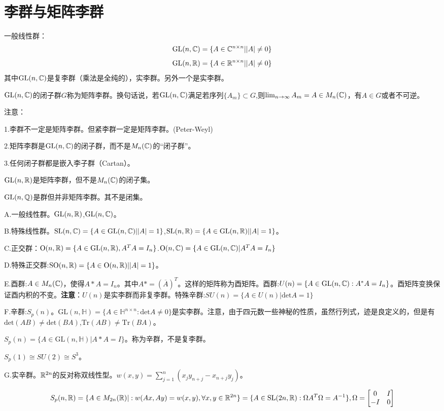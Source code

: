 \section{李群与矩阵李群}
一般线性群：
$$
\mathrm{GL}(n,\mathbb{C})=\{A \in \mathbb{C}^{n\times n}||A|\neq 0\}
$$
$$
\mathrm{GL}(n,\mathbb{R})=\{A \in \mathbb{R}^{n\times n}||A|\neq 0\}
$$
其中$\mathrm{GL}(n,\mathbb{C})$是复李群（乘法是全纯的），实李群。另外一个是实李群。
\begin{definition}[矩阵李群]
    $\mathrm{GL}(n,\mathbb{C})$的闭子群$G$称为矩阵李群。换句话说，若$\mathrm{GL}(n,\mathbb{C})$满足若序列$\{A_m\}\subset G$,则$\lim_{n \to \infty}A_m =A \in M_n(\mathbb{C})$，有$A \in G$或者不可逆。
\end{definition}
注意：

1.李群不一定是矩阵李群。但紧李群一定是矩阵李群。(Peter-Weyl)

2.矩阵李群是$\mathrm{GL}(n,\mathbb{C})$的闭子群，而不是$M_n(\mathbb{C})$的“闭子群”。

3.任何闭子群都是嵌入李子群（Cartan）。

\begin{example}
    $\mathrm{GL}(n,\mathbb{R})$是矩阵李群，但不是$M_n(\mathbb{C})$的闭子集。

    $\mathrm{GL}(n,\mathbb{Q})$是群但并非矩阵李群。其不是闭集。
\end{example}
\begin{example}[矩阵群的例子]
    A.一般线性群。$\mathrm{GL}(n,\mathbb{R})$,$\mathrm{GL}(n,\mathbb{C})$。

    B.特殊线性群。$\mathrm{SL}(n,\mathbb{C})=\{A \in \mathrm{GL}(n,\mathbb{C})||A|=1\}$,$\mathrm{SL}(n,\mathbb{R})=\{A \in \mathrm{GL}(n,\mathbb{R})||A|=1\}$。

    C.正交群：$\mathrm{O}(n,\mathbb{R})=\{A \in \mathrm{GL}(n,\mathbb{R}),A^T A=I_n\}$.$\mathrm{O}(n,\mathbb{C})=\{A \in \mathrm{GL}(n,\mathbb{C})|A^T A=I_n\}$

    D.特殊正交群:$\mathrm{SO}(n,\mathbb{R})=\{A \in \mathrm{O}(n,\mathbb{R})||A|=1\}$。

    E.酉群:$A \in M_n(\mathbb{C})$，使得$A*A =I_n$。其中$A*=(\overline{A})^T$。这样的矩阵称为酉矩阵。酉群:$U(n)=\{A \in \mathrm{GL}(n,\mathbb{C}):A^*A=I_n\}$。酉矩阵变换保证酉内积的不变。\textbf{注意}：$U(n)$是实李群而非复李群。特殊辛群:$SU(n)=\{A \in U(n)|\mathrm{det}A=1\}$

    F.辛群:$S_p(n)$。$\mathrm{GL}(n,\mathbb{H})=\{A\in \mathbb{H}^{n \times n}:\mathrm{det} A\neq 0\}$是实李群。注意，由于四元数一些神秘的性质，虽然行列式，迹是良定义的，但是有$\mathrm{det}(AB)\neq \mathrm{det}(BA)$,$\mathrm{Tr}(AB)\neq \mathrm{Tr}(BA)$。
 
    $S_p(n)=\{A \in \mathrm{GL}(n,\mathbb{H})|A*A=I\}$。称为辛群，不是复李群。

    $S_p(1)\cong SU(2) \cong S^3$。

    G.实辛群。$\mathbb{R}^{2n}$的反对称双线性型。$w(x,y)=\sum_{j=1}^n(x_jy_{n+j}-x_{n+j}y_j)$。

    $$
    S_p(n,\mathbb{R})=\{A \in M_{2n}(\mathbb{R})|:w(Ax,Ay)=w(x,y),\forall x,y \in \mathbb{R}^{2n}\}=\{A \in \mathrm{SL}(2n,\mathbb{R}):\Omega A^T \Omega=A^{-1}\}, \Omega=\begin{bmatrix}
        0&I\\-I&0
    \end{bmatrix}
    $$
\end{example}
